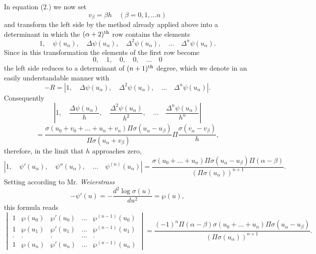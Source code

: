 \documentclass[12pt]{article}
\begin{document}
In equation (2.) we now set
\begin{equation*}
v_\beta = \beta h \quad (\beta = 0, 1, \dots n)
\end{equation*}
and transform the left side by the method already applied above into a determinant in which the $(\alpha+2)\textsuperscript{th}$ row contains the elements
\begin{equation*}
1, \quad \psi(u_\alpha), \quad \Delta\psi(u_\alpha), \quad \Delta^2\psi(u_\alpha), \quad \dots \quad \Delta^n\psi(u_\alpha).
\end{equation*}
Since in this transformation the elements of the first row become
\begin{equation*}
0, \quad 1, \quad 0, \quad 0, \quad \dots \quad 0
\end{equation*}
the left side reduces to a determinant of $(n+1)\textsuperscript{th}$ degree, which we denote in an easily understandable manner with
\begin{equation*}
-R = |1, \quad \Delta\psi(u_\alpha), \quad \Delta^2\psi(u_\alpha), \quad \dots \quad \Delta^n\psi(u_\alpha)|.
\end{equation*}
Consequently
\begin{equation*}
\left| 1, \quad \frac{\Delta\psi(u_\alpha)}{h}, \quad \frac{\Delta^2\psi(u_\alpha)}{h^2}, \quad \dots \quad \frac{\Delta^n\psi(u_\alpha)}{h^n} \right|
\end{equation*}
\begin{equation*}
= \frac{\sigma(u_0+v_0+\dots+u_n+v_n)\Pi\sigma(u_\alpha-u_\beta)}{\Pi\sigma(u_\alpha+v_\beta)} \Pi\frac{\sigma(v_\alpha-v_\beta)}{h},
\end{equation*}
therefore, in the limit that $h$ approaches zero,
\begin{equation*}
|1, \quad \psi'(u_\alpha), \quad \psi''(u_\alpha), \quad \dots \quad \psi^{(n)}(u_\alpha)| = \frac{\sigma(u_0+\dots+u_n)\Pi\sigma(u_\alpha-u_\beta)\Pi(\alpha-\beta)}{(\Pi\sigma(u_\alpha))^{n+1}}.
\end{equation*}
Setting according to Mr. \textit{Weierstrass}
\begin{equation*}
-\psi'(u) = -\frac{d^2\log\sigma(u)}{du^2} = \wp(u),
\end{equation*}
this formula reads
\begin{equation}
\begin{vmatrix}
1 & \wp(u_0) & \wp'(u_0) & \dots & \wp^{(n-1)}(u_0) \\
1 & \wp(u_1) & \wp'(u_1) & \dots & \wp^{(n-1)}(u_1) \\
. & . & . & \dots & . \\
1 & \wp(u_n) & \wp'(u_n) & \dots & \wp^{(n-1)}(u_n)
\end{vmatrix}
= \frac{(-1)^n\Pi(\alpha-\beta)\sigma(u_0+\dots+u_n)\Pi\sigma(u_\alpha-u_\beta)}{(\Pi\sigma(u_\alpha))^{n+1}}.
\end{equation}
\end{document}

